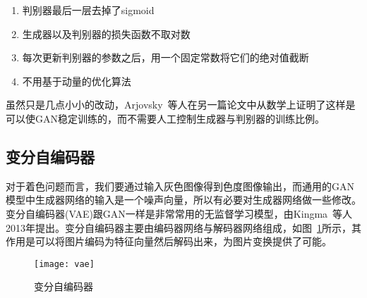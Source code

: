   \begin{enumerate}
    \item 判别器最后一层去掉了sigmoid
    \item 生成器以及判别器的损失函数不取对数
    \item 每次更新判别器的参数之后，用一个固定常数将它们的绝对值截断
    \item 不用基于动量的优化算法
  \end{enumerate}

  虽然只是几点小小的改动，Arjovsky~\cite{DBLP:journals/corr/ArjovskyB17}等人在另一篇论文中从数学上证明了这样是可以使GAN稳定训练的，而不需要人工控制生成器与判别器的训练比例。

\subsection{变分自编码器}
\label{sec:2-vae}
  
  对于着色问题而言，我们要通过输入灰色图像得到色度图像输出，而通用的GAN模型中生成器网络的输入是一个噪声向量，所以有必要对生成器网络做一些修改。变分自编码器(VAE)跟GAN一样是非常常用的无监督学习模型，由Kingma~\cite{DBLP:journals/corr/KingmaW13}等人2013年提出。变分自编码器主要由编码器网络与解码器网络组成，如图~\ref{fig:vae}所示，其作用是可以将图片编码为特征向量然后解码出来，为图片变换提供了可能。

  \begin{figure}[H]
    \centering
    \texttt{[image: vae]}
    \caption{变分自编码器}
    \label{fig:vae}
  \end{figure}

